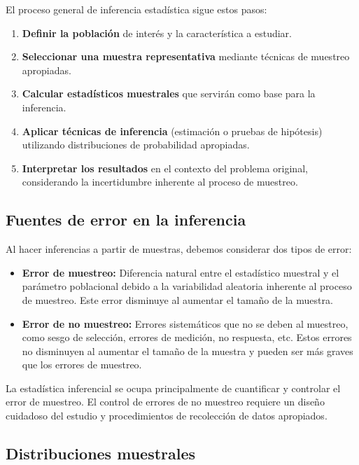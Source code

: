 El proceso general de inferencia estadística sigue estos pasos:

\begin{enumerate}
	\item \textbf{Definir la población} de interés y la característica a estudiar.
	\item \textbf{Seleccionar una muestra representativa} mediante técnicas de muestreo apropiadas.
	\item \textbf{Calcular estadísticos muestrales} que servirán como base para la inferencia.
	\item \textbf{Aplicar técnicas de inferencia} (estimación o pruebas de hipótesis) utilizando distribuciones de probabilidad apropiadas.
	\item \textbf{Interpretar los resultados} en el contexto del problema original, considerando la incertidumbre inherente al proceso de muestreo.
\end{enumerate}

\subsection*{Fuentes de error en la inferencia}

Al hacer inferencias a partir de muestras, debemos considerar dos tipos de error:

\begin{itemize}
	\item \textbf{Error de muestreo:} Diferencia natural entre el estadístico muestral y el parámetro poblacional debido a la variabilidad aleatoria inherente al proceso de muestreo. Este error disminuye al aumentar el tamaño de la muestra.
	
	\item \textbf{Error de no muestreo:} Errores sistemáticos que no se deben al muestreo, como sesgo de selección, errores de medición, no respuesta, etc. Estos errores no disminuyen al aumentar el tamaño de la muestra y pueden ser más graves que los errores de muestreo.
\end{itemize}

\begin{observacion}
	La estadística inferencial se ocupa principalmente de cuantificar y controlar el error de muestreo. El control de errores de no muestreo requiere un diseño cuidadoso del estudio y procedimientos de recolección de datos apropiados.
\end{observacion}

\subsection*{Distribuciones muestrales}

